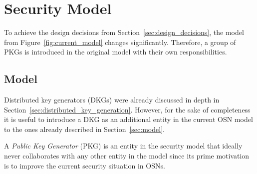 \section{Security Model}
To achieve the design decisions from Section~\ref{sec:design_decisions}, the model from Figure~\ref{fig:current_model} changes significantly. Therefore, a group of PKGs is introduced in the original model with their own responsibilities.

\subsection{Model}
Distributed key generators (DKGs) were already discussed in depth in Section~\ref{sec:distributed_key_generation}. However, for the sake of completeness it is useful to introduce a DKG as an additional entity in the current OSN model to the ones already described in Section~\ref{sec:model}.

\begin{defn}
\label{def:dkg}
 A \textit{Public Key Generator} (PKG) is an entity in the security model that ideally never collaborates with any other entity in the model since its prime motivation is to improve the current security situation in OSNs.
\end{defn}

